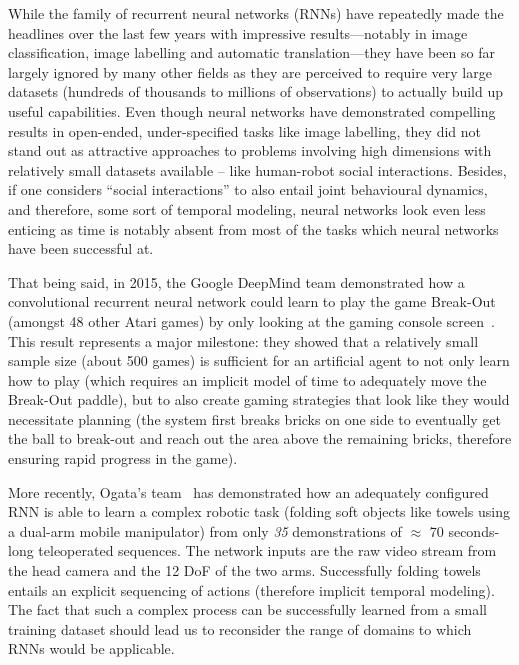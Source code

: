 \documentclass{article}
\begin{document}
While the family of recurrent neural networks (RNNs) have repeatedly made the
headlines over the last few years with impressive results---notably in image
classification, image labelling and automatic translation---they have been so far 
largely ignored by  many other fields as they are perceived to require very
large datasets (hundreds of thousands to millions of observations) to actually
build up useful capabilities. 
Even though neural networks have demonstrated
compelling results in open-ended, under-specified tasks like image labelling, they
did not stand out as attractive approaches to problems involving high dimensions
with relatively small datasets available -- like human-robot social
interactions.
Besides, if one considers ``social interactions'' to also entail joint
behavioural dynamics, and therefore, some sort of temporal modeling, neural
networks look even less enticing as time is notably absent from most of the
tasks which neural networks have been successful at.

That being said, in 2015, the Google DeepMind team demonstrated how a convolutional
recurrent neural network could learn to play the game Break-Out (amongst
48 other Atari games) by only looking at the gaming console
screen~\cite{mnih2015human}. This result represents a major milestone: they showed
that a relatively small sample size (about 500 games) is sufficient for an 
artificial agent to not only learn how to play (which requires an implicit model 
of time to adequately move the Break-Out paddle), but to also create gaming 
strategies that look like they would necessitate planning (the system first
breaks bricks on one side to eventually get the ball to break-out and reach out the area
above the remaining bricks, therefore ensuring rapid progress in the
game).

More recently, Ogata's team~\cite{yang2017repeatable} has demonstrated how an
adequately configured RNN is able to learn a complex robotic task (folding soft
objects like towels using a dual-arm mobile manipulator) from only \emph{35}
demonstrations of $\approx$ 70 seconds-long teleoperated
sequences. The network inputs are the raw video stream from the head camera and the
12 DoF of the two arms. Successfully folding towels entails an explicit sequencing of
actions (therefore implicit temporal modeling). The fact that such a complex
process can be successfully learned from a small training dataset should lead
us to reconsider the range of domains to which RNNs would be applicable.
\end{document}
